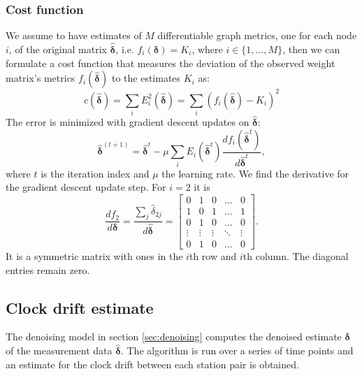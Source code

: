 \documentclass[12pt,a4paper,english]{article}
\begin{document}
\subsubsection{Cost function}
We assume to have estimates of $M$ differentiable graph metrics, one for each node $i$, of the original matrix $\bm{\hat{\delta}}$, i.e. $f_i(\bm{\delta}) = K_i$, where $i\in\{ 1,\dots, M \}$, then we can formulate a cost function that measures the deviation of the observed weight matrix's metrics $f_i(\bm{\hat{\delta}})$ to the estimates $K_i$ as: 
\begin{equation}
c(\bm{\hat{\delta}}) = \sum_i E_i^2(\bm{\hat{\delta}}) = \sum_i(f_i(\bm{\hat{\delta}})-K_i)^2
\end{equation}
The error is minimized with gradient descent updates on $\bm{\hat{\delta}}$: 
\begin{equation}
\bm{\hat{\delta}}^{(t+1)} = \bm{\hat{\delta}}^t-\mu\sum_i E_i(\bm{\hat{\delta}}^t)\frac{df_i(\bm{\hat{\delta}}^t)}{d\bm{\hat{\delta}}^t},
\label{eq:updates}
\end{equation}
where $t$ is the iteration index and $\mu$ the learning rate. %
We find the derivative for the gradient descent update step. For $i=2$ it is
\begin{equation}
\frac{df_2}{d\bm{\delta}}=\frac{\sum_j \hat{\delta}_{2j}}{d\bm{\hat{\delta}}}=
\begin{bmatrix}
    0 & 1 & 0 & \dots  & 0 \\
    1 & 0 & 1 & \dots  & 1 \\
    0 & 1 & 0 & \dots  & 0 \\
    \vdots & \vdots & \vdots & \ddots & \vdots \\
    0 & 1 & 0 & \dots  & 0
\end{bmatrix}.
\end{equation}
It is a symmetric matrix with ones in the $i$th row and $i$th column. The diagonal entries remain zero.

\subsection{Clock drift estimate}

The denoising model in section \ref{sec:denoising} computes the denoised estimate $\bm{\delta}$ of the measurement data $\bm{\hat{\delta}}$. The algorithm is run over a series of time points and an estimate for the clock drift between each station pair is obtained. 
\end{document}
